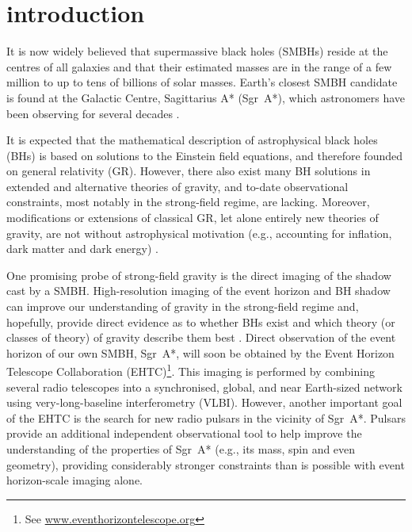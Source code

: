 \documentclass[a4paper,aps,twocolumn,showpacs,showkeys,nofootinbib,preprintnumbers,superscriptaddress,amsmath,amssymb,amsfonts]{revtex4-1}
\begin{document}


\maketitle

\section{introduction}
\label{sec:uno}

It is now widely believed that
supermassive black holes (SMBHs) reside at the centres of all galaxies and
that their estimated masses are in the range of a few million to up to
tens of billions of solar masses. 
Earth's closest SMBH candidate is found at the Galactic Centre,
Sagittarius A* (Sgr~A*), which astronomers have been observing for
several decades \cite{Eckart1996,Ghez:2008}.

It is expected that the mathematical description of astrophysical black
holes (BHs) is based on solutions to the Einstein field equations, and therefore
founded on general relativity (GR).
However, there also exist many BH solutions in extended and alternative
theories of gravity, and to-date observational constraints, most notably in the 
strong-field regime, are lacking.
Moreover, modifications or extensions of classical GR, let alone entirely
new theories of gravity, are not without astrophysical motivation 
(e.g., accounting for inflation, dark matter and dark energy) \cite[see][for a review]{Capozziello2011}.

One promising probe of strong-field gravity is the direct imaging of
the shadow cast by a SMBH.
High-resolution imaging of the event horizon and BH shadow can
improve our understanding of gravity in the strong-field regime
and, hopefully, provide direct evidence as to whether BHs exist and which
theory (or classes of theory) of gravity describe them best 
\cite{Cunningham1973, Falcke2000,
Grenzebach14, Abdujabbarov2015, Younsi2016}. 
Direct observation of the event horizon of our own
SMBH, Sgr~A*, will soon be obtained by the Event Horizon Telescope
Collaboration (EHTC)\footnote{See
\href{http://www.eventhorizontelescope.org}{www.eventhorizontelescope.org}}\cite{Doeleman2008,Akiyama2015,Fish2016, Goddi2017}. 
This imaging is performed by combining several radio telescopes into a
synchronised, global, and near Earth-sized network using
very-long-baseline interferometry (VLBI). 
However, another important goal of the
EHTC is the search for new radio pulsars in the vicinity of Sgr~A*.
Pulsars provide an additional independent observational tool
to help improve the understanding of the properties of Sgr~A*
(e.g., its mass, spin and even geometry),
providing considerably stronger constraints than is possible with
event horizon-scale imaging alone.
\end{document}
